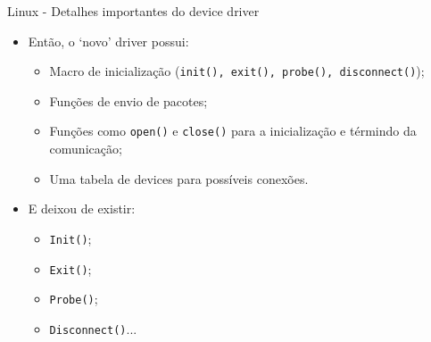 		\begin{frame}{Linux - Detalhes importantes do device driver}
			\begin{itemize}
				\item Então, o `novo' driver possui:
				\begin{itemize} 
					\item Macro de inicialização (\texttt{init(), exit(), probe(), disconnect()});
					\item Funções de envio de pacotes;
					\item Funções como \texttt{open()} e \texttt{close()} para a inicialização e términdo da comunicação;
					\item Uma tabela de devices para possíveis conexões.
				\end{itemize}
				\item E deixou de existir:
				\begin{itemize}
					\item \texttt{Init()};
					\item \texttt{Exit()};
					\item \texttt{Probe()};
					\item \texttt{Disconnect()}...
				\end{itemize}
			\end{itemize}
		\end{frame}

